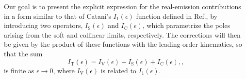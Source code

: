 \documentclass[a4paper, 12pt]{book}
\begin{document}
%
%

Our goal is to present the explicit expression for the real-emission contributions in a form similar to that of Catani's $I_1(\epsilon)$ function defined in Ref.\cite{Catani:1998bh}, by introducing two operators, $I_{\mathrm{S}}(\epsilon)$ and $I_{\mathrm{C}}(\epsilon)$, which parametrize the poles arising from the soft and collinear limits, respectively. The corrections will then be given by the product of these functions with the leading-order kinematics, so that the sum
\begin{equation}
I_{\mathrm{T}}(\epsilon) = I_{\mathrm{V}}(\epsilon) + I_{\mathrm{S}} (\epsilon)+ I_{\mathrm{C}}(\epsilon) , ,
\end{equation}
is finite as $\epsilon \to 0$, where $I_{\mathrm{V}}(\epsilon)$ is related to $I_1(\epsilon)$.
  
\end{document}
